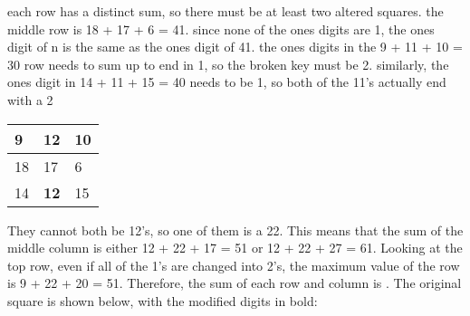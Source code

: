 \documentclass[a4paper]{article}
\theoremstyle{definition}
\begin{document}
\begin{enumerate}
\begin{tcolorbox}[width=\linewidth, sharp corners=all, colback=white!95!black]

each row has a distinct sum, so there must be at least two altered squares. the middle row
is 18 + 17 + 6 = 41. since none of the ones digits are 1, the ones digit of n is the same as
the ones digit of 41.
the ones digits in the 9 + 11 + 10 = 30 row needs to sum up to end in 1, so the broken key
must be 2. similarly, the ones digit in 14 + 11 + 15 = 40 needs to be 1, so both of the 11’s
actually end with a 2
\end{tcolorbox}

\begin{table}[h]
    \begin{center}

\begin{tabular}{|l|l|l|}
\hline
9  & \textbf{12} & 10 \\ \hline
18 & 17 & 6  \\ \hline
14 & \textbf{12} & 15 \\ \hline
\end{tabular}
\end{center}
\end{table}

\begin{tcolorbox}[width=\linewidth, sharp corners=all, colback=white!95!black]

They cannot both be 12’s, so one of them is a 22. This means that the sum of the middle
column is either 12 + 22 + 17 = 51 or 12 + 22 + 27 = 61. Looking at the top row, even if all
of the 1’s are changed into 2’s, the maximum value of the row is 9 + 22 + 20 = 51. Therefore,
the sum of each row and column is  .
The original square is shown below, with the modified digits in bold:
\end{tcolorbox}
\begin{table}[h]
    \begin{center}


\end{center}
\end{table}
\end{enumerate}
\end{document}
